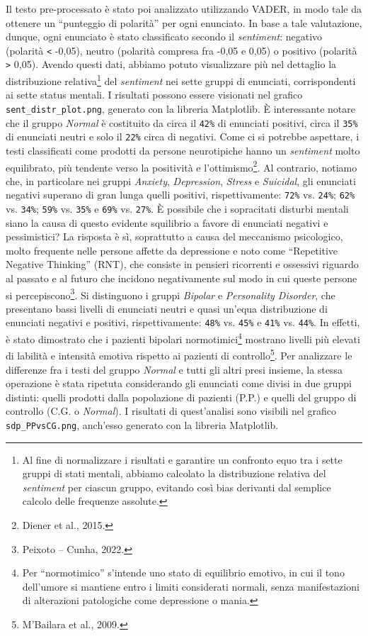 \documentclass[11pt]{article}
\begin{document}
Il testo pre-processato è stato poi analizzato utilizzando VADER, in modo tale da ottenere un “punteggio di polarità” per ogni enunciato. In base a tale valutazione, dunque, ogni enunciato è stato classificato secondo il \textit{sentiment}: negativo (polarità \texttt{<} -0,05), neutro (polarità compresa fra -0,05 e 0,05) o positivo (polarità \texttt{>} 0,05). 
Avendo questi dati, abbiamo potuto visualizzare più nel dettaglio la distribuzione relativa\footnote{Al fine di normalizzare i risultati e garantire un confronto equo tra i sette gruppi di stati mentali, abbiamo calcolato la distribuzione relativa del \textit{sentiment} per ciascun gruppo, evitando così bias derivanti dal semplice calcolo delle frequenze assolute.} del \textit{sentiment} nei sette gruppi di enunciati, corrispondenti ai sette status mentali. I risultati possono essere visionati nel grafico \texttt{sent\_distr\_plot.png}, generato con la libreria Matplotlib. È interessante notare che il gruppo \textit{Normal} è costituito da circa il \texttt{42\%} di enunciati positivi, circa il \texttt{35\%} di enunciati neutri e solo il \texttt{22\%} circa di negativi. Come ci si potrebbe aspettare, i testi classificati come prodotti da persone neurotipiche hanno un \textit{sentiment} molto equilibrato, più tendente verso la positività e l’ottimismo\footnote{Diener et al., 2015.}. Al contrario, notiamo che, in particolare nei gruppi \textit{Anxiety}, \textit{Depression}, \textit{Stress} e \textit{Suicidal}, gli enunciati negativi superano di gran lunga quelli positivi, rispettivamente: \texttt{72\%} vs. \texttt{24\%}; \texttt{62\%} vs. \texttt{34\%}; \texttt{59\%} vs. \texttt{35\%} e \texttt{69\%} vs. \texttt{27\%}. È possibile che i sopracitati disturbi mentali siano la causa di questo evidente squilibrio a favore di enunciati negativi e pessimistici? La risposta è sì, soprattutto a causa del meccanismo psicologico, molto frequente nelle persone affette da depressione e noto come “Repetitive Negative Thinking” (RNT), che consiste in pensieri ricorrenti e ossessivi riguardo al passato e al futuro che incidono negativamente sul modo in cui queste persone si percepiscono\footnote{Peixoto – Cunha, 2022.}. Si distinguono i gruppi \textit{Bipolar} e \textit{Personality Disorder}, che presentano bassi livelli di enunciati neutri e quasi un’equa distribuzione di enunciati negativi e positivi, rispettivamente: \texttt{48\%} vs. \texttt{45\%} e \texttt{41\%} vs. \texttt{44\%}. In effetti, è stato dimostrato che i pazienti bipolari normotimici\footnote{Per “normotimico” s’intende uno stato di equilibrio emotivo, in cui il tono dell'umore si mantiene entro i limiti considerati normali, senza manifestazioni di alterazioni patologiche come depressione o mania.} mostrano livelli più elevati di labilità e intensità emotiva rispetto ai pazienti di controllo\footnote{M’Bailara et al., 2009.}. Per analizzare le differenze fra i testi del gruppo \textit{Normal} e tutti gli altri presi insieme, la stessa operazione è stata ripetuta considerando gli enunciati come divisi in due gruppi distinti: quelli prodotti dalla popolazione di pazienti (P.P.) e quelli del gruppo di controllo (C.G. o \textit{Normal}). I risultati di quest’analisi sono visibili nel grafico \texttt{sdp\_PPvsCG.png}, anch’esso generato con la libreria Matplotlib. 
\end{document}
